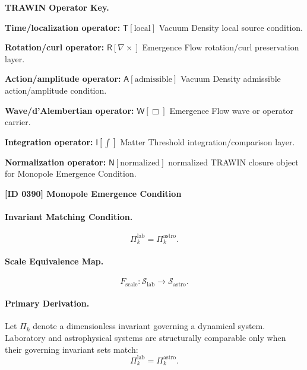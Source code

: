 \par\vspace{0.45\baselineskip}
\noindent\begin{minipage}[t]{\linewidth}
\begingroup
\small
\raggedright
\textbf{TRAWIN Operator Key.}\par
\noindent\textbf{Time/localization operator:} $\mathsf{T}\!\left[\mathrm{local}\right]$ Vacuum Density local source condition.\par
\noindent\textbf{Rotation/curl operator:} $\mathsf{R}\!\left[\nabla\times\right]$ Emergence Flow rotation/curl preservation layer.\par
\noindent\textbf{Action/amplitude operator:} $\mathsf{A}\!\left[\mathrm{admissible}\right]$ Vacuum Density admissible action/amplitude condition.\par
\noindent\textbf{Wave/d'Alembertian operator:} $\mathsf{W}\!\left[\Box\right]$ Emergence Flow wave or operator carrier.\par
\noindent\textbf{Integration operator:} $\mathsf{I}\!\left[\int\right]$ Matter Threshold integration/comparison layer.\par
\noindent\textbf{Normalization operator:} $\mathsf{N}\!\left[\mathrm{normalized}\right]$ normalized TRAWIN closure object for Monopole Emergence Condition.\par
\endgroup
\end{minipage}

\clearpage
\noindent\textbf{[ID 0390] Monopole Emergence Condition}\par
\vspace{0.35em}
\paragraph{Invariant Matching Condition.}
\begin{equation}
\Pi_k^{\mathrm{lab}}
=
\Pi_k^{\mathrm{astro}} .
\end{equation}

\paragraph{Scale Equivalence Map.}
\begin{equation}
F_{\mathrm{scale}}:
\mathcal{S}_{\mathrm{lab}}
\longrightarrow
\mathcal{S}_{\mathrm{astro}} .
\end{equation}

\paragraph{Primary Derivation.}
Let $\Pi_k$ denote a dimensionless invariant governing a dynamical system.  
Laboratory and astrophysical systems are structurally comparable only when their governing invariant sets match:
\begin{equation}
\Pi_k^{\mathrm{lab}}
=
\Pi_k^{\mathrm{astro}} .
\end{equation}

